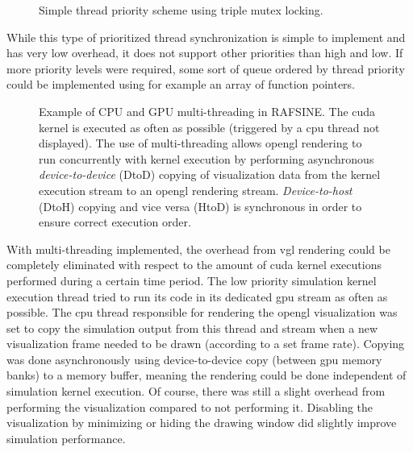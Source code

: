 \begin{figure}[H]
\centering 
\begin{scriptsize}
\def\svgwidth{0.7\linewidth}

\end{scriptsize}
\caption{Simple thread priority scheme using triple mutex locking.}
\label{fig:mutex}
\end{figure}

While this type of prioritized thread synchronization is simple to implement and has very low overhead, it does not support other priorities than high and low. If more priority levels were required, some sort of queue ordered by thread priority could be implemented using for example an array of function pointers.

\begin{figure}[!htb]
\centering 
\begin{scriptsize}
\def\svgwidth{1.0\linewidth}

\end{scriptsize}
\caption{Example of CPU and GPU multi-threading in RAFSINE. The \gls{cuda} kernel is executed as often as possible (triggered by a \gls{cpu} thread not displayed). The use of multi-threading allows \gls{opengl} rendering to run concurrently with kernel execution by performing asynchronous \textit{device-to-device} (DtoD) copying of visualization data from the kernel execution stream to an \gls{opengl} rendering stream.  \textit{Device-to-host} (DtoH) copying and vice versa (HtoD) is synchronous in order to ensure correct execution order.}
\label{fig:threads}
\end{figure}

With multi-threading implemented, the overhead from \gls{vgl} rendering could be completely eliminated with respect to the amount of \gls{cuda} kernel executions performed during a certain time period. The low priority simulation kernel execution thread tried to run its code in its dedicated \gls{gpu} stream as often as possible. The \gls{cpu} thread responsible for rendering the \gls{opengl} visualization was set to copy the simulation output from this thread and stream when a new visualization frame needed to be drawn (according to a set frame rate). Copying was done asynchronously using device-to-device copy (between \gls{gpu} memory banks) to a memory buffer, meaning the rendering could be done independent of simulation kernel execution. Of course, there was still a slight overhead from performing the visualization compared to not performing it. Disabling the visualization by minimizing or hiding the drawing window did slightly improve simulation performance.


